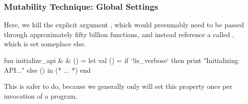 \documentclass[aspectratio=169, handout]{beamer}
\begin{document}
\begin{frame}[fragile]
  \frametitle{Mutability Technique: Global Settings}

  Here, we kill the explicit argument , which would
  presumably need to be passed through approximately fifty billion functions,
  and instead reference a  called , which is
  set someplace else.

  \pause
  \vspace{\fill}

  \begin{codeblock}
    fun initialize_api & & () =
      let
        val () = if `!is_verbose` then
                   print "Initializing API...\n"
                 else ()
      in
        (* ... *)
      end
  \end{codeblock}

  \pause
  \vspace{\fill}

  This is safer to do, because we generally only will set this property once
  per invocation of a program.
\end{frame}



\thankyou
\end{document}
